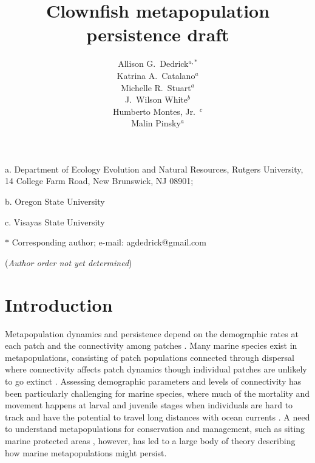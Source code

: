 \documentclass[12pt, oneside]{article}   	%
\author{}
\author{Allison G.\ Dedrick$^{a, \ast}$ \\
Katrina A.\ Catalano$^a$ \\
Michelle R.\ Stuart$^a$ \\
J.\ Wilson White$^b$ \\
Humberto Montes, Jr.\ $^c$ \\
Malin Pinsky$^a$}
\title{Clownfish metapopulation persistence draft}
\date{}
\begin{document}
\renewcommand{\topfraction}{0.95}
\maketitle{}

\noindent{} a. Department of Ecology Evolution and Natural Resources, Rutgers University, 14 College Farm Road, New Brunswick, NJ 08901;

\noindent{} b. Oregon State University

\noindent{} c. Visayas State University

\noindent{} $\ast$ Corresponding author; e-mail: agdedrick@gmail.com

(\textit{Author order not yet determined})


\bigskip




\linenumbers{}
\modulolinenumbers[3]

\section*{Introduction}

Metapopulation dynamics and persistence depend on the demographic rates at each patch and the connectivity among patches \citep[e.g.][]{hastings_persistence_2006, hanski1998metapopulation}. Many marine species exist in metapopulations, consisting of patch populations connected through dispersal where connectivity affects patch dynamics though individual patches are unlikely to go extinct \citep{kritzer2006marine}. Assessing demographic parameters and levels of connectivity has been particularly challenging for marine species, where much of the mortality and movement happens at larval and juvenile stages when individuals are hard to track and have the potential to travel long distances with ocean currents \citep[e.g.][]{kritzer2006marine, cowen_larval_2009, roughgarden_recruitment_1988}. A need to understand metapopulations for conservation and management, such as siting marine protected areas \citep[e.g.][]{botsford_dependence_2001,white_population_2010}, however, has led to a large body of theory describing how marine metapopulations might persist. %
\end{document}
